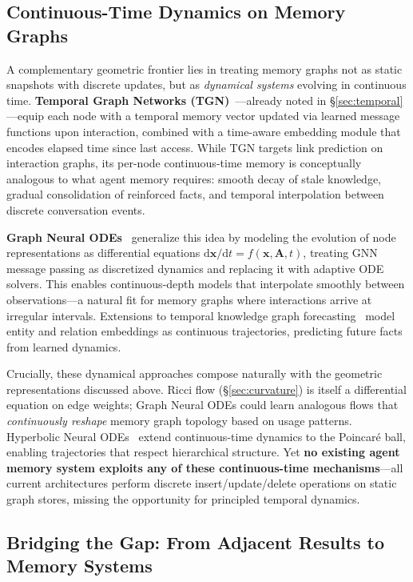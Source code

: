 \documentclass[hf]{ceurart}
\begin{document}
\subsection{Continuous-Time Dynamics on Memory Graphs}

A complementary geometric frontier lies in treating memory graphs not as
static snapshots with discrete updates, but as \emph{dynamical systems}
evolving in continuous time. \textbf{Temporal Graph Networks
(TGN)}~\cite{tgn2020}---already noted in \S\ref{sec:temporal}---equip
each node with a temporal memory vector updated via learned message
functions upon interaction, combined with a time-aware embedding module
that encodes elapsed time since last access. While TGN targets link
prediction on interaction graphs, its per-node continuous-time memory is
conceptually analogous to what agent memory requires: smooth decay of
stale knowledge, gradual consolidation of reinforced facts, and temporal
interpolation between discrete conversation events.

\textbf{Graph Neural ODEs}~\cite{graphneuralodessurvey2024} generalize
this idea by modeling the evolution of node representations as
differential equations $\mathrm{d}\mathbf{x}/\mathrm{d}t =
f(\mathbf{x}, \mathbf{A}, t)$, treating GNN message passing as
discretized dynamics and replacing it with adaptive ODE solvers. This
enables continuous-depth models that interpolate smoothly between
observations---a natural fit for memory graphs where interactions arrive
at irregular intervals. Extensions to temporal knowledge graph
forecasting~\cite{neuralodetkgsurvey2023} model entity and relation
embeddings as continuous trajectories, predicting future facts from
learned dynamics.

Crucially, these dynamical approaches compose naturally with the
geometric representations discussed above. Ricci flow
(\S\ref{sec:curvature}) is itself a differential equation on edge
weights; Graph Neural ODEs could learn analogous flows that
\emph{continuously reshape} memory graph topology based on usage
patterns. Hyperbolic Neural ODEs~\cite{hyperbolicneuralode2023} extend
continuous-time dynamics to the Poincar\'{e} ball, enabling trajectories
that respect hierarchical structure. Yet \textbf{no existing agent memory
system exploits any of these continuous-time mechanisms}---all current
architectures perform discrete insert/update/delete operations on
static graph stores, missing the opportunity for principled temporal
dynamics.

\subsection{Bridging the Gap: From Adjacent Results to Memory Systems}
\end{document}
